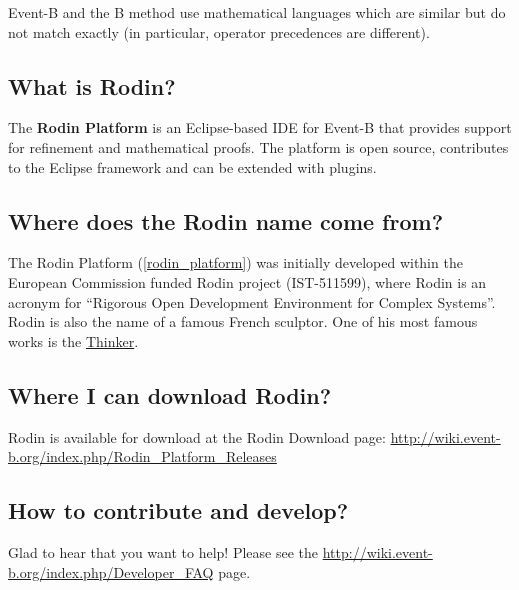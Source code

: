 Event-B and the B method use mathematical languages which are similar but do not match exactly (in particular, operator precedences are different).

\subsection{What is Rodin?}

The \textbf{Rodin Platform} is an Eclipse-based IDE for Event-B that provides support for refinement and mathematical proofs. The platform is open source, contributes to the Eclipse framework and can be extended with plugins.

\subsection{Where does the Rodin name come from?}

The Rodin Platform (\ref{rodin_platform}) was initially developed within the European Commission funded Rodin project (IST-511599), where Rodin is an acronym for ``Rigorous Open Development Environment for Complex Systems''. Rodin is also the name of a famous French sculptor. One of his most famous works is the \href{http://en.wikipedia.org/wiki/The_Thinker}{Thinker}. 

\subsection{Where I can download Rodin?}
\label{faq_where_download_rodin}

Rodin is available for download at the Rodin Download page: \url{http://wiki.event-b.org/index.php/Rodin_Platform_Releases}

\subsection{How to contribute and develop?}

Glad to hear that you want to help!  Please see the \url{http://wiki.event-b.org/index.php/Developer_FAQ} page.

